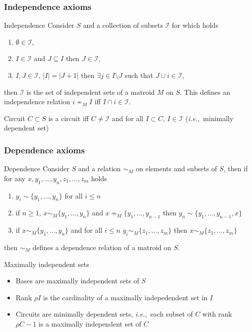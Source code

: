 \documentclass[bigger]{beamer}
\newcommand{\ie}{{\em i.e.},~}
\begin{document}
\begin{frame}
\frametitle{Independence axioms}
\begin{block}{Independence}
  Consider $S$ and a collection of subsets $\mathscr{I}$ for which
  holds
  \begin{enumerate}
  \item $\emptyset \in \mathscr{I}$,
  \item $I \in \mathscr{I}$ and $J \subseteq I$ then $J \in
    \mathscr{I}$,
  \item $I,J \in \mathscr{I}$, $|I| = |J + 1|$ then $\exists j \in I
    \setminus J$ such that $J \cup i \in \mathscr{I}$,
  \end{enumerate}
  then $\mathscr{I}$ is the set of independent sets of a matroid $M$
  on $S$. This defines an independence relation $i \nsim_M I$ iff
  $I\cap i \in \mathscr{I}$. 
\end{block}

\begin{block}{Circuit}
  $C \subset S$ is a circuit iff $C \neq \mathscr{I}$ and for all $I
  \subset C$, $I \in \mathscr{I}$ (\ie minimally dependent set)
\end{block}
\end{frame}


\begin{frame}
\frametitle{Dependence axioms}

\begin{block}{Dependence}
  Consider $S$ and a relation $\sim_M$ on elements and subsets of $S$,
  then if for any $x,y_1,...,y_n,z_1,...,z_m$ holds
  \begin{enumerate}
  \item $y_i \sim \{y_1,...,y_n\}$ for all $i \leq n$
  \item if $n\geq 1$, $x \sim_M \{y_1,...,y_n\}$ and $x \nsim_M
    \{y_1,...,y_{n-1}$ then $y_n \sim \{y_1,...,y_{n-1},x\}$
  \item if $x \sim_M \{y_1,...,y_n\}$ and for all $i \leq n$ $y_i
    \sim_M \{z_1,...,z_m\}$ then $x \sim_M \{z_1,...,z_m\}$
  \end{enumerate}
  then $\sim_M$ defines a dependence relation of a matroid on $S$.
\end{block}

\end{frame}

\begin{frame}{Maximally independent sets}
  \begin{itemize}
  \item Bases are maximally independent sets of $S$
  \item Rank $\rho I$ is the cardinality of a maximally indepedendent set in $I$
  \item Circuits are minimally dependent sets, \ie each subset of $C$
    with rank $\rho C - 1$ is a maximally independent set of $C$
  \end{itemize}
\end{frame}
\end{document}

